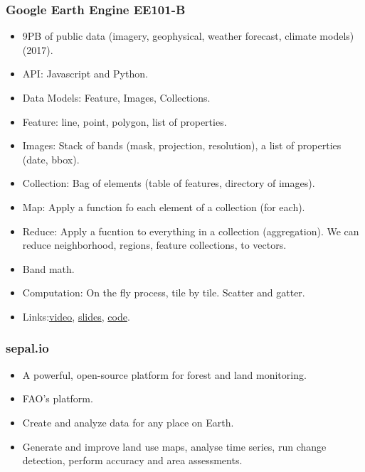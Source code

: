 \documentclass{beamer}
\begin{document}
\begin{frame}[t, allowframebreaks]
    \frametitle{Google Earth Engine EE101-B}
    \begin{itemize}
        \item 9PB of public data (imagery, geophysical, weather forecast, 
            climate models) (2017).
        \item API: Javascript and Python.
        \item Data Models: Feature,  Images, Collections.
        \item Feature: line, point, polygon, list of properties.
        \item Images: Stack of bands (mask, projection, resolution), a list of 
            properties (date, bbox).
            \item Collection: Bag of elements (table of features, directory of
            images).
        \item Map: Apply a function fo each element of a collection (for each).
        \item Reduce: Apply a fucntion to everything in a collection 
            (aggregation). We can reduce neighborhood, regions, feature 
            collections, to vectors.
        \item Band math.
        \item Computation: On the fly process, tile by tile. Scatter and 
            gatter.
        \item Links:\href{https://youtu.be/m1ejxSi3l8s}{video}, 
            \href{goo.gl/ZUqPXz}{slides},
            \href{goo.gl/01kki0}{code}.
    \end{itemize}
\end{frame}



\begin{frame}[t, allowframebreaks]
    \frametitle{sepal.io}
    \begin{itemize}
        \item A powerful, open-source platform for forest and land monitoring.
        \item FAO's platform.
        \item Create and analyze data for any place on Earth.
        \item Generate and improve land use maps, analyse time series, run
            change detection, perform accuracy and area assessments.
    \end{itemize}
\end{frame}
\end{document}
